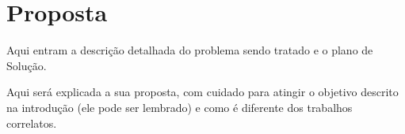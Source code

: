 \section{Proposta}



Aqui entram a descrição detalhada do problema sendo tratado e o plano de Solução.

Aqui será explicada a sua proposta, com cuidado para atingir o objetivo descrito na introdução (ele pode ser lembrado) e como é diferente dos trabalhos correlatos.





